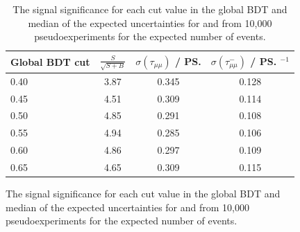 \begin{figure}[tbp]
{\begin{table}[htbp]
\begin{center}
\begin{tabular}{lccc}
\hline
Global BDT cut & $\frac{S}{\sqrt{S+B}}$&  $\sigma \left(\tau_{\mu\mu} \right)$   / \ps & $\sigma \left(\tau^{-}_{\mu\mu} \right)$ / \ps$^{-1}$ \\   
\hline
0.40           & 3.87 & 0.345 & 0.128 \\ %
0.45        & 4.51 & 0.309 & 0.114 \\ %
0.50        & 4.85 & 0.291 & 0.108 \\ %
0.55       & 4.94 & 0.285 & 0.106 \\ %
0.60           & 4.86 & 0.297 & 0.109 \\ %
0.65            & 4.65 & 0.309 & 0.115 \\  \hline%
\end{tabular} 
\vspace{0.7cm}
\caption{ The signal significance for each cut value in the global BDT and median of the expected uncertainties for \tmumu and \invtmumu from 10,000 pseudoexperiments for the expected number of events. }
\label{tab:selOptimisation}
\end{center}
\vspace{-1.0cm}
\end{table}

}
\end{figure}
